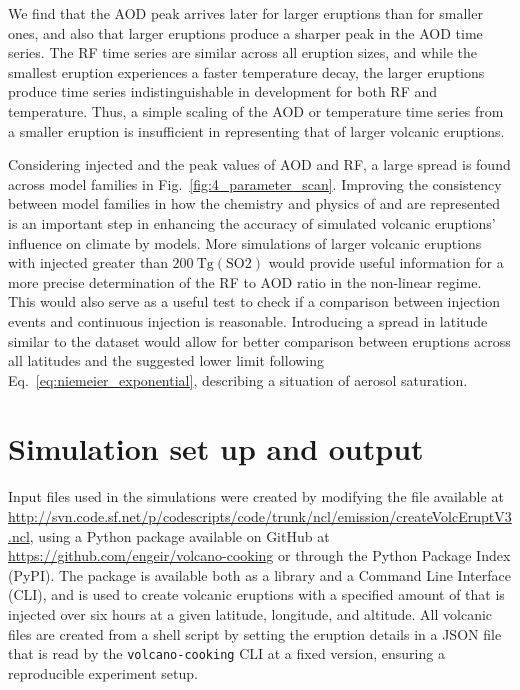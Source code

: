 \documentclass[draft]{agujournal2019}
\begin{document}
We find that the AOD peak arrives later for larger eruptions than for smaller ones, and
also that larger eruptions produce a sharper peak in the AOD time series. The RF time
series are similar across all eruption sizes, and while the smallest eruption
experiences a faster temperature decay, the larger eruptions produce time series
indistinguishable in development for both RF and temperature. Thus, a simple scaling of
the AOD or temperature time series from a smaller eruption is insufficient in
representing that of larger volcanic eruptions.

Considering injected  and the peak values of AOD and RF, a large spread is found
across model families in Fig.~\ref{fig:4_parameter_scan}. Improving the consistency
between model families in how the chemistry and physics of  and  are
represented is an important step in enhancing the accuracy of simulated volcanic
eruptions' influence on climate by models. More simulations of larger volcanic eruptions
with injected  greater than \(\SI{200}{\tera\gram(\mathrm{SO2})}\) would provide
useful information for a more precise determination of the RF to AOD ratio in the
non-linear regime. This would also serve as a useful test to check if a comparison
between  injection events and continuous  injection is reasonable.
Introducing a spread in latitude similar to the  dataset
would allow for better comparison between eruptions across all latitudes and the
suggested lower limit following Eq.~\ref{eq:niemeier_exponential}, describing a
situation of aerosol saturation.

\appendix
\section{Simulation set up and output}

Input files used in the simulations were created by modifying the file available at
\url{http://svn.code.sf.net/p/codescripts/code/trunk/ncl/emission/createVolcEruptV3.ncl},
using a Python package available on GitHub at
\url{https://github.com/engeir/volcano-cooking} or through the Python Package Index
(PyPI). The package is available both as a library and a Command Line Interface (CLI),
and is used to create volcanic eruptions with a specified amount of  that is
injected over six hours at a given latitude, longitude, and altitude. All volcanic
 files are created from a shell script by setting the eruption details in a JSON
file that is read by the \texttt{volcano-cooking} CLI at a fixed version, ensuring a
reproducible experiment setup.
\end{document}
